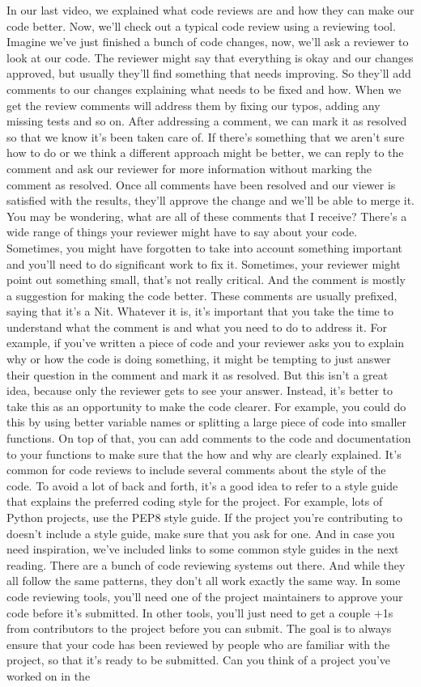 	In our last video, we explained what code reviews are and how they can make our code better. Now, we'll check out a typical code review using a reviewing tool. Imagine we've just finished a bunch of code changes, now, we'll ask a reviewer to look at our code. The reviewer might say that everything is okay and our changes approved, but usually they'll find something that needs improving. So they'll add comments to our changes explaining what needs to be fixed and how. When we get the review comments will address them by fixing our typos, adding any missing tests and so on. After addressing a comment, we can mark it as resolved so that we know it's been taken care of. If there's something that we aren't sure how to do or we think a different approach might be better, we can reply to the comment and ask our reviewer for more information without marking the comment as resolved. Once all comments have been resolved and our viewer is satisfied with the results, they'll approve the change and we'll be able to merge it. You may be wondering, what are all of these comments that I receive? There's a wide range of things your reviewer might have to say about your code. Sometimes, you might have forgotten to take into account something important and you'll need to do significant work to fix it. Sometimes, your reviewer might point out something small, that's not really critical. And the comment is mostly a suggestion for making the code better. These comments are usually prefixed, saying that it's a Nit. Whatever it is, it's important that you take the time to understand what the comment is and what you need to do to address it. For example, if you've written a piece of code and your reviewer asks you to explain why or how the code is doing something, it might be tempting to just answer their question in the comment and mark it as resolved. But this isn't a great idea, because only the reviewer gets to see your answer. Instead, it's better to take this as an opportunity to make the code clearer. For example, you could do this by using better variable names or splitting a large piece of code into smaller functions. On top of that, you can add comments to the code and documentation to your functions to make sure that the how and why are clearly explained. It's common for code reviews to include several comments about the style of the code. To avoid a lot of back and forth, it's a good idea to refer to a style guide that explains the preferred coding style for the project. For example, lots of Python projects, use the PEP8 style guide. If the project you're contributing to doesn't include a style guide, make sure that you ask for one. And in case you need inspiration, we've included links to some common style guides in the next reading. There are a bunch of code reviewing systems out there. And while they all follow the same patterns, they don't all work exactly the same way. In some code reviewing tools, you'll need one of the project maintainers to approve your code before it's submitted. In other tools, you'll just need to get a couple +1s from contributors to the project before you can submit. The goal is to always ensure that your code has been reviewed by people who are familiar with the project, so that it's ready to be submitted. Can you think of a project you've worked on in the 